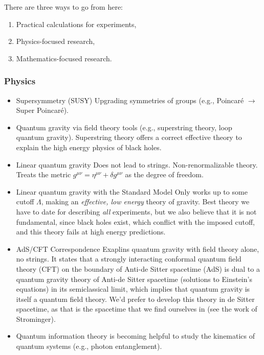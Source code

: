 \noindent There are three ways to go from here:

\begin{enumerate}
\item Practical calculations for experiments, 
\item Physics-focused research,
\item Mathematics-focused research.
\end{enumerate}

\subsubsection*{Physics}

\begin{itemize}
\item Supersymmetry (SUSY)
	\subitem Upgrading symmetries of groups (e.g., Poincar\'e $\rightarrow$ Super Poincar\'e).
\item Quantum gravity via field theory tools (e.g., superstring theory, loop quantum gravity).
	\subitem Superstring theory offers a correct effective theory to explain the high energy physics of black holes.
\item Linear quantum gravity
	\subitem Does not lead to strings.
	\subitem Non-renormalizable theory.
	\subitem Treats the metric $g^{\mu\nu} = \eta^{\mu\nu} + \delta g^{\mu\nu}$ as the degree of freedom.
\item Linear quantum gravity with the Standard Model
	\subitem Only works up to some cutoff $\Lambda$, making an \textit{effective, low energy} theory of gravity. 
	\subitem Best theory we have to date for describing \textit{all} experiments, but we also believe that it is not fundamental, since black holes exist, which conflict with the imposed cutoff, and this theory fails at high energy predictions.
\item AdS/CFT Correspondence
	\subitem Exaplins quantum gravity with field theory alone, no strings.
	\subitem It states that a strongly interacting conformal quantum field theory (CFT) on the boundary of Anti-de Sitter spacetime (AdS) is dual to a quantum gravity theory of Anti-de Sitter spacetime (solutions to Einstein's equations) in its semiclassical limit, which implies that quantum gravity is itself a quantum field theory.
	\subitem We'd prefer to develop this theory in de Sitter spacetime, as that is the spacetime that we find ourselves in (see the work of Strominger).
\item Quantum information theory is becoming helpful to study the kinematics of quantum systems (e.g., photon entanglement).
\end{itemize}

